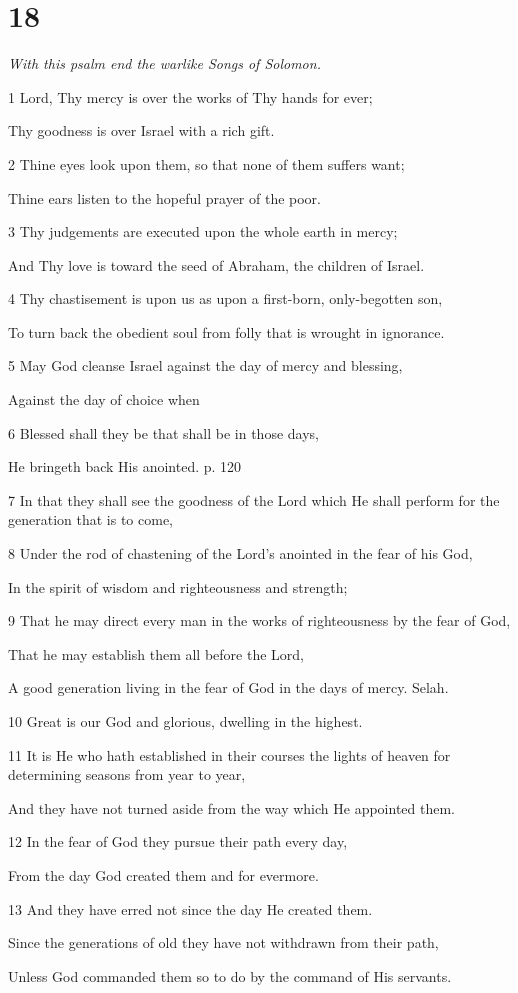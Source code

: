 \chapter{18}

\par \textit{With this psalm end the warlike Songs of Solomon.}

\par 1 Lord, Thy mercy is over the works of Thy hands for ever;
\par  Thy goodness is over Israel with a rich gift.
\par 2 Thine eyes look upon them, so that none of them suffers want;
\par  Thine ears listen to the hopeful prayer of the poor.
\par 3 Thy judgements are executed upon the whole earth in mercy;
\par  And Thy love is toward the seed of Abraham, the children of Israel.
\par 4 Thy chastisement is upon us as upon a first-born, only-begotten son,
\par  To turn back the obedient soul from folly that is wrought in ignorance.
\par 5 May God cleanse Israel against the day of mercy and blessing,
\par  Against the day of choice when
\par 6 Blessed shall they be that shall be in those days,
\par  He bringeth back His anointed. p. 120
\par 7 In that they shall see the goodness of the Lord which He shall perform for the generation that is to come,
\par 8 Under the rod of chastening of the Lord's anointed in the fear of his God,
\par  In the spirit of wisdom and righteousness and strength;
\par 9 That he may direct every man in the works of righteousness by the fear of God,
\par  That he may establish them all before the Lord,
\par  A good generation living in the fear of God in the days of mercy. Selah.
\par    
\par 10 Great is our God and glorious, dwelling in the highest.
\par 11 It is He who hath established in their courses the lights of heaven for determining seasons from year to year,
\par  And they have not turned aside from the way which He appointed them.
\par 12 In the fear of God they pursue their path every day,
\par  From the day God created them and for evermore.
\par 13 And they have erred not since the day He created them.
\par  Since the generations of old they have not withdrawn from their path,
\par  Unless God commanded them so to do by the command of His servants.


